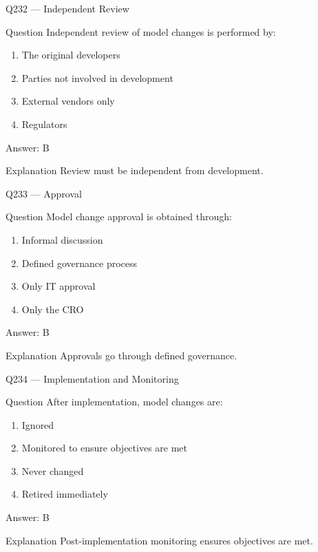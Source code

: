 \documentclass[aspectratio=169,8pt]{beamer}
\begin{document}
\begin{frame}{Q232 --- Independent Review}
\begin{block}{Question}
Independent review of model changes is performed by:
\begin{enumerate}
\item The original developers
\item Parties not involved in development
\item External vendors only
\item Regulators
\end{enumerate}
\end{block}
\begin{exampleblock}{Answer: B}\end{exampleblock}
\begin{block}{Explanation}
Review must be independent from development.
\end{block}
\end{frame}

\begin{frame}{Q233 --- Approval}
\begin{block}{Question}
Model change approval is obtained through:
\begin{enumerate}
\item Informal discussion
\item Defined governance process
\item Only IT approval
\item Only the CRO
\end{enumerate}
\end{block}
\begin{exampleblock}{Answer: B}\end{exampleblock}
\begin{block}{Explanation}
Approvals go through defined governance.
\end{block}
\end{frame}

\begin{frame}{Q234 --- Implementation and Monitoring}
\begin{block}{Question}
After implementation, model changes are:
\begin{enumerate}
\item Ignored
\item Monitored to ensure objectives are met
\item Never changed
\item Retired immediately
\end{enumerate}
\end{block}
\begin{exampleblock}{Answer: B}\end{exampleblock}
\begin{block}{Explanation}
Post-implementation monitoring ensures objectives are met.
\end{block}
\end{frame}
\end{document}
